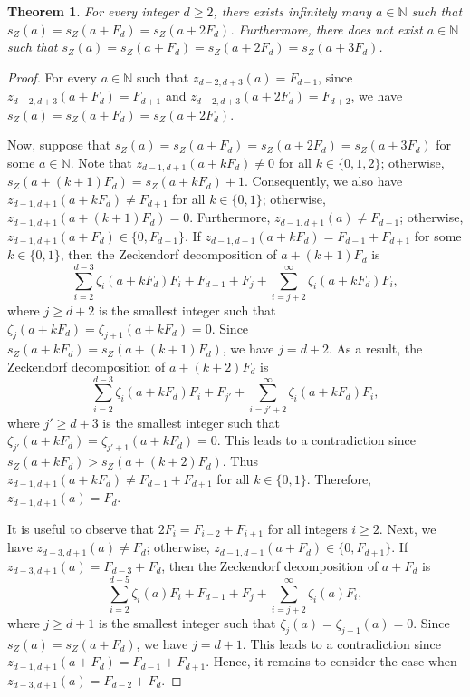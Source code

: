 \documentclass[12pt]{article}
\newtheorem{theorem}{Theorem}[section]
\theoremstyle{definition}
\newcommand{\N}{\mathbb{N}}
\begin{document}
\begin{theorem}\label{thm:samesZ}
For every integer $d\geq2$, there exists infinitely many $a\in\N$ such that $s_Z(a)=s_Z(a+F_d)=s_Z(a+2F_d)$. Furthermore, there does not exist $a\in\N$ such that $s_Z(a)=s_Z(a+F_d)=s_Z(a+2F_d)=s_Z(a+3F_d)$.
\end{theorem}
\begin{proof}
For every $a\in\N$ such that $z_{d-2,d+3}(a)=F_{d-1}$, since $z_{d-2,d+3}(a+F_d)=F_{d+1}$ and $z_{d-2,d+3}(a+2F_d)=F_{d+2}$, we have $s_Z(a)=s_Z(a+F_d)=s_Z(a+2F_d)$.

Now, suppose that $s_Z(a)=s_Z(a+F_d)=s_Z(a+2F_d)=s_Z(a+3F_d)$ for some $a\in\N$. Note that $z_{d-1,d+1}(a+kF_d)\neq0$ for all $k\in\{0,1,2\}$; otherwise, $s_Z(a+(k+1)F_d)=s_Z(a+kF_d)+1$. Consequently, we also have $z_{d-1,d+1}(a+kF_d)\neq F_{d+1}$ for all $k\in\{0,1\}$; otherwise, $z_{d-1,d+1}(a+(k+1)F_d)=0$. Furthermore, $z_{d-1,d+1}(a)\neq F_{d-1}$; otherwise, $z_{d-1,d+1}(a+F_d)\in\{0,F_{d+1}\}$. If $z_{d-1,d+1}(a+kF_d)=F_{d-1}+F_{d+1}$ for some $k\in\{0,1\}$, then the Zeckendorf decomposition of $a+(k+1)F_d$ is
\[\sum_{i=2}^{d-3}\zeta_i(a+kF_d)F_i+F_{d-1}+F_j+\sum_{i=j+2}^\infty\zeta_i(a+kF_d)F_i,\]
where $j\geq d+2$ is the smallest integer such that $\zeta_j(a+kF_d)=\zeta_{j+1}(a+kF_d)=0$. Since $s_Z(a+kF_d)=s_Z(a+(k+1)F_d)$, we have $j=d+2$. As a result, the Zeckendorf decomposition of $a+(k+2)F_d$ is
\[\sum_{i=2}^{d-3}\zeta_i(a+kF_d)F_i+F_{j'}+\sum_{i=j'+2}^\infty\zeta_i(a+kF_d)F_i,\]
where $j'\geq d+3$ is the smallest integer such that $\zeta_{j'}(a+kF_d)=\zeta_{j'+1}(a+kF_d)=0$. This leads to a contradiction since $s_Z(a+kF_d)>s_Z(a+(k+2)F_d)$. Thus $z_{d-1,d+1}(a+kF_d)\neq F_{d-1}+F_{d+1}$ for all $k\in\{0,1\}$. Therefore, $z_{d-1,d+1}(a)=F_d$.

It is useful to observe that $2F_i=F_{i-2}+F_{i+1}$ for all integers $i\geq2$. Next, we have $z_{d-3,d+1}(a)\neq F_d$; otherwise, $z_{d-1,d+1}(a+F_d)\in\{0,F_{d+1}\}$. If $z_{d-3,d+1}(a)=F_{d-3}+F_d$, then the Zeckendorf decomposition of $a+F_d$ is
\[\sum_{i=2}^{d-5}\zeta_i(a)F_i+F_{d-1}+F_j+\sum_{i=j+2}^\infty\zeta_i(a)F_i,\]
where $j\geq d+1$ is the smallest integer such that $\zeta_j(a)=\zeta_{j+1}(a)=0$. Since $s_Z(a)=s_Z(a+F_d)$, we have $j=d+1$. This leads to a contradiction since $z_{d-1,d+1}(a+F_d)=F_{d-1}+F_{d+1}$. Hence, it remains to consider the case when $z_{d-3,d+1}(a)=F_{d-2}+F_d$.


\end{proof}
\end{document}

